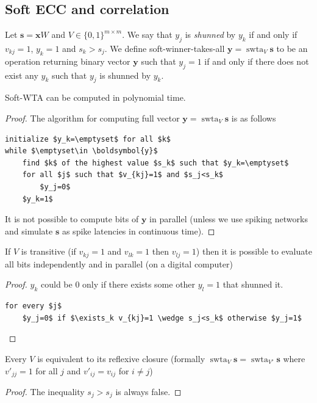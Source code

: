 \documentclass[oneside,english,logo]{amuthesis}
\DeclareMathOperator{\swta}{swta}
\begin{document}
\subsection{Soft ECC and correlation}
\begin{definition}
Let $\boldsymbol{s}=\boldsymbol{x} W$ and $V\in \{0,1\}^{m\times m}$. 	
We say that $y_j$ is \textit{shunned} by $y_k$ if and only if  $v_{kj}=1$, $y_k=1$ and $s_k>s_j$. We define soft-winner-takes-all  $\boldsymbol{y}=\swta_V \boldsymbol{s}$ to be an operation returning binary vector $\boldsymbol{y}$ such that $y_j=1$ if and only if there does not exist any $y_k$ such that  $y_j$ is shunned by $y_k$.
\end{definition}
\begin{theorem} \label{theorem:algorithm_for_swta}
Soft-WTA can be computed in polynomial time.
\end{theorem}
\begin{proof}
 The algorithm for computing full vector $\boldsymbol{y}=\swta_V \boldsymbol{s}$ is as follows
\begin{lstlisting}
initialize $y_k=\emptyset$ for all $k$
while $\emptyset\in \boldsymbol{y}$
    find $k$ of the highest value $s_k$ such that $y_k=\emptyset$
    for all $j$ such that $v_{kj}=1$ and $s_j<s_k$
        $y_j=0$ 
    $y_k=1$
\end{lstlisting}
It is not possible to compute bits of $\boldsymbol{y}$ in parallel (unless we use spiking networks and simulate $\boldsymbol{s}$ as spike latencies in continuous time). 
\end{proof}
\begin{theorem}
 If $V$ is transitive (if $v_{kj}=1$ and $v_{lk}=1$ then $v_{lj}=1$) then it is possible to evaluate all bits independently and in parallel (on a digital computer)
\end{theorem}
\begin{proof}
  $y_{k}$ could be $0$ only if there exists some other $y_l=1$ that shunned it.
\begin{lstlisting}
for every $j$
    $y_j=0$ if $\exists_k v_{kj}=1 \wedge s_j<s_k$ otherwise $y_j=1$
\end{lstlisting}
\end{proof}
\begin{theorem}
Every $V$ is equivalent to its reflexive closure (formally $\swta_V \boldsymbol{s}=\swta_{V'} \boldsymbol{s}$ where  $v'_{jj}=1$ for all $j$ and $v'_{ij}=v_{ij}$ for $i\ne j$) 
\end{theorem}
\begin{proof}
The inequality $s_j > s_j$ is always false.
\end{proof}
\end{document}
